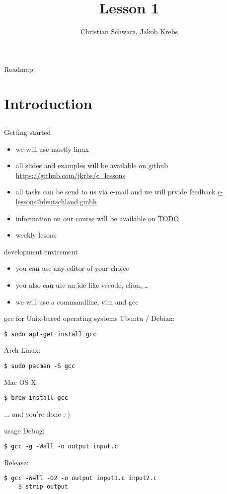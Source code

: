 \documentclass[10pt,graphics,aspectratio=169,table]{beamer}
\title{Lesson 1}
\author{Christian Schwarz, Jakob Krebs}
\begin{document}
\maketitle
\begin{frame}{Roadmap}
  \tableofcontents
\end{frame}
\section{Introduction}
\subsection{}
\begin{frame}{Getting started}
  \begin{itemize}
  \item we will use mostly linux
  \item all slides and examples will be available on github
    \url{https://github.com/jkrbs/c_lessons}
  \item all tasks can be send to us via e-mail and we will prvide feedback
    \url{c-lessons@deutschland.gmbh}
  \item information on our course will be available on \url{TODO}
  \item weekly lesons %
  \end{itemize}
\end{frame}

\begin{frame}{development envirement}
  \begin{itemize}
  \item you can use any editor of your choice
  \item you also can use an ide like vscode, clion, \ldots
  \item we will use a commandline, vim and gcc
  \end{itemize}
  
\end{frame}
\begin{frame}[fragile]{gcc for Unix-based operating systems}
	Ubuntu / Debian:
	\begin{lstlisting}[numbers=none]
    $ sudo apt-get install gcc
  \end{lstlisting}
	\bigskip
	Arch Linux:
	\begin{lstlisting}[numbers=none]
    $ sudo pacman -S gcc
  \end{lstlisting}
	\bigskip
	Mac OS X:
	\begin{lstlisting}[numbers=none]
    $ brew install gcc
  \end{lstlisting}
	\bigskip
	... and you're done ;-)
\end{frame} 
\begin{frame}[fragile]{usage}
  Debug:
    \begin{lstlisting}[numbers=none]
    $ gcc -g -Wall -o output input.c
  \end{lstlisting}
  \bigskip
  Release:
    \begin{lstlisting}[numbers=none]
    $ gcc -Wall -O2 -o output input1.c input2.c
    $ strip output
  \end{lstlisting}
\end{frame}
\end{document}
